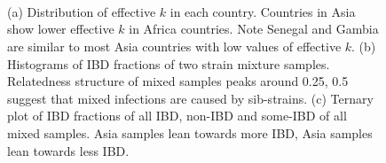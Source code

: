 \documentclass{article}
\begin{document}
\begin{figure}[htp]
  \centering{}
  \\
  \\
  \\
  \caption{(a) Distribution of effective $k$ in each country. Countries in Asia show lower effective $k$ in Africa countries. Note Senegal and Gambia are similar to most Asia countries with low values of effective $k$. (b) Histograms of IBD fractions of two strain mixture samples. Relatedness structure of mixed samples peaks around 0.25, 0.5 suggest that mixed infections are caused by sib-strains. (c) Ternary plot of IBD fractions of all IBD, non-IBD and some-IBD of all mixed samples. Asia samples lean towards more IBD, Asia samples lean towards less IBD.}
  \label{fig:IBD_frac_hist}
\end{figure}
\end{document}

